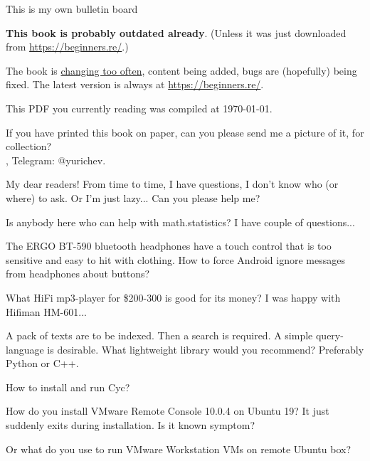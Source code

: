
\begin{center}
\LARGE{} This is my own bulletin board \normalsize{}
\end{center}

\textbf{This book is probably outdated already}.
(Unless it was just downloaded from \url{https://beginners.re/}.)

The book is \href{https://github.com/DennisYurichev/RE-for-beginners/commits/master}{changing too often},
content being added, bugs are (hopefully) being fixed.
The latest version is always at \url{https://beginners.re/}.

This PDF you currently reading was compiled at \today{}.

\myhrule{}

If you have printed this book on paper, can you please send me a picture of it, for collection?\\
\EMAIL{}, Telegram: @yurichev.

\myhrule{}

My dear readers! From time to time, I have questions, I don't know who (or where) to ask.
Or I'm just lazy...
Can you please help me?

\myhrule{}

Is anybody here who can help with math.statistics? I have couple of questions...

\myhrule{}

The ERGO BT-590 bluetooth headphones have a touch control that is too sensitive and easy to hit with clothing.
How to force Android ignore messages from headphones about buttons?

\myhrule{}

What HiFi mp3-player for \$200-300 is good for its money?
I was happy with Hifiman HM-601...

\myhrule{}

A pack of texts are to be indexed. Then a search is required. A simple query-language is desirable.
What lightweight library would you recommend?
Preferably Python or C++.

\myhrule{}

How to install and run Cyc?

\myhrule{}

How do you install VMware Remote Console 10.0.4 on Ubuntu 19? It just suddenly exits during installation.
Is it known symptom?

Or what do you use to run VMware Workstation VMs on remote Ubuntu box?

